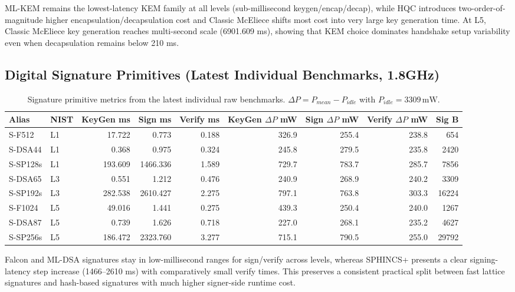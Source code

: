 ML-KEM remains the lowest-latency KEM family at all levels (sub-millisecond keygen/encap/decap), while HQC introduces two-order-of-magnitude higher encapsulation/decapsulation cost and Classic McEliece shifts most cost into very large key generation time. At L5, Classic McEliece key generation reaches multi-second scale (6901.609 ms), showing that KEM choice dominates handshake setup variability even when decapsulation remains below 210 ms.

\subsection{Digital Signature Primitives (Latest Individual Benchmarks, 1.8GHz)}
\begin{table}[t]
\centering
\caption{Signature primitive metrics from the latest individual raw benchmarks. $\Delta P = P_{mean}-P_{idle}$ with $P_{idle}=3309\,\mathrm{mW}$.}
\footnotesize
\setlength{\tabcolsep}{3pt}
\begin{tabular}{@{}llrrrrrrr@{}}\toprule
Alias & NIST & KeyGen ms & Sign ms & Verify ms & KeyGen $\Delta P$ mW & Sign $\Delta P$ mW & Verify $\Delta P$ mW & Sig B \\ \midrule
S-F512 & L1 & 17.722 & 0.773 & 0.188 & 326.9 & 255.4 & 238.8 & 654 \\
S-DSA44 & L1 & 0.368 & 0.975 & 0.324 & 245.8 & 279.5 & 235.8 & 2420 \\
S-SP128s & L1 & 193.609 & 1466.336 & 1.589 & 729.7 & 783.7 & 285.7 & 7856 \\
S-DSA65 & L3 & 0.551 & 1.212 & 0.476 & 240.9 & 268.9 & 240.2 & 3309 \\
S-SP192s & L3 & 282.538 & 2610.427 & 2.275 & 797.1 & 763.8 & 303.3 & 16224 \\
S-F1024 & L5 & 49.016 & 1.441 & 0.275 & 439.3 & 250.4 & 240.0 & 1267 \\
S-DSA87 & L5 & 0.739 & 1.626 & 0.718 & 227.0 & 268.1 & 235.2 & 4627 \\
S-SP256s & L5 & 186.472 & 2323.760 & 3.277 & 715.1 & 790.5 & 255.0 & 29792 \\
\bottomrule\end{tabular}
\label{tab:sig-primitives-latest-manual}
\end{table}

Falcon and ML-DSA signatures stay in low-millisecond ranges for sign/verify across levels, whereas SPHINCS+ presents a clear signing-latency step increase (1466--2610 ms) with comparatively small verify times. This preserves a consistent practical split between fast lattice signatures and hash-based signatures with much higher signer-side runtime cost.

